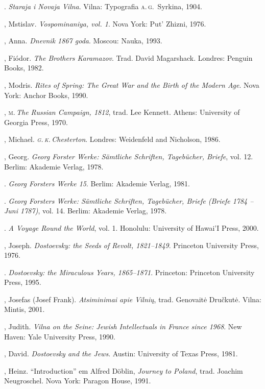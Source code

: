\begin{bibliohedra}
  \titidem. \textit{Staraja i Novaja Vilna}. Vilna: Typografia \textsc{a.\,g.}\,
  Syrkina, 1904.

  , Mstislav. \textit{Vospominaniya, vol. 1}. Nova York: Put'
  Zhizni, 1976.

  , Anna. \textit{Dnevnik 1867 goda}.
  Moscou: Nauka, 1993.

  , Fiódor. \textit{The Brothers Karamazov}. Trad. David
  Magarshack. Londres: Penguin Books, 1982.

  , Modris. \textit{Rites of Spring: The Great War and the Birth
  of the Modern Age}. Nova York: Anchor Books, 1990.

  , \textsc{m}.\,\textit{The Russian Campaign, 1812}, trad. Lee Kennett.
  Athens: University of Georgia Press, 1970.

  , Michael. \textit{\textsc{g.\,k.}\,Chesterton}. Londres: Weidenfeld and
  Nicholson, 1986.

  , Georg. \textit{Georg Forster Werke: Sämtliche Schriften,
  Tagebücher, Briefe}, vol. 12. Berlim: Akademie
  Verlag, 1978.

  \titidem. \textit{Georg Forsters Werke 15}.
  Berlim: Akademie Verlag, 1981.

  \titidem. \textit{Georg Forsters Werke: Sämtliche Schriften,
  Tagebücher, Briefe (Briefe 1784 -- Juni 1787)}, vol. 14. Berlim: Akademie Verlag, 1978.

  \titidem. \textit{A Voyage Round the World}, vol. 1. Honolulu:
  University of Hawai'I Press, 2000.

  , Joseph. \textit{Dostoevsky: the Seeds of Revolt, 1821--1849}.
  Princeton University Press, 1976.

  \titidem. \textit{Dostoevsky: the Miraculous Years, 1865--1871}.
  Princeton: Princeton University Press, 1995.

  , Josefas (Josef Frank). \textit{Atsiminimai apie Vilnių}, trad.
  Genovaitė Dručkutė. Vilna: Mintis, 2001.

  , Judith. \textit{Vilna on the Seine: Jewish Intellectuals in
  France since 1968}. New Haven: Yale University Press, 1990.

  , David. \textit{Dostoevsky and the Jews}. Austin: University
  of Texas Press, 1981.

  , Heinz. ``Introduction'' em Alfred Döblin, \textit{Journey to
  Poland}, trad. Joachim Neugroschel. Nova York: Paragon House, 1991.


\end{bibliohedra}
